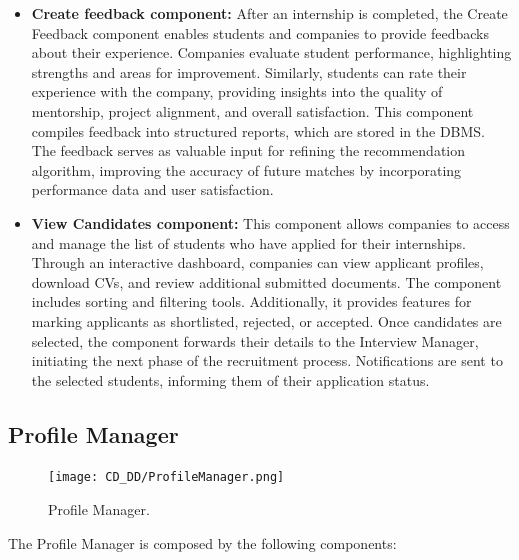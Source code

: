 \begin{itemize}
    \item \textbf{Create feedback component:} After an internship is completed, the Create Feedback component enables students and companies to provide feedbacks about their experience. Companies evaluate student performance, highlighting strengths and areas for improvement. Similarly, students can rate their experience with the company, providing insights into the quality of mentorship, project alignment, and overall satisfaction. This component compiles feedback into structured reports, which are stored in the DBMS. The feedback serves as valuable input for refining the recommendation algorithm, improving the accuracy of future matches by incorporating performance data and user satisfaction.
    \item \textbf{View Candidates component:} This component allows companies to access and manage the list of students who have applied for their internships. Through an interactive dashboard, companies can view applicant profiles, download CVs, and review additional submitted documents. The component includes sorting and filtering tools. Additionally, it provides features for marking applicants as shortlisted, rejected, or accepted. Once candidates are selected, the component forwards their details to the Interview Manager, initiating the next phase of the recruitment process. Notifications are sent to the selected students, informing them of their application status.
\end{itemize}

\subsection{Profile Manager}
\label{subsec:profile_manager}%

\begin{figure}[H]
    \begin{center}
        \texttt{[image: CD\_DD/ProfileManager.png]}
        \caption{Profile Manager.}
        \label{fig:profile_manager}%
    \end{center}
\end{figure}

\noindent The Profile Manager is composed by the following components:

